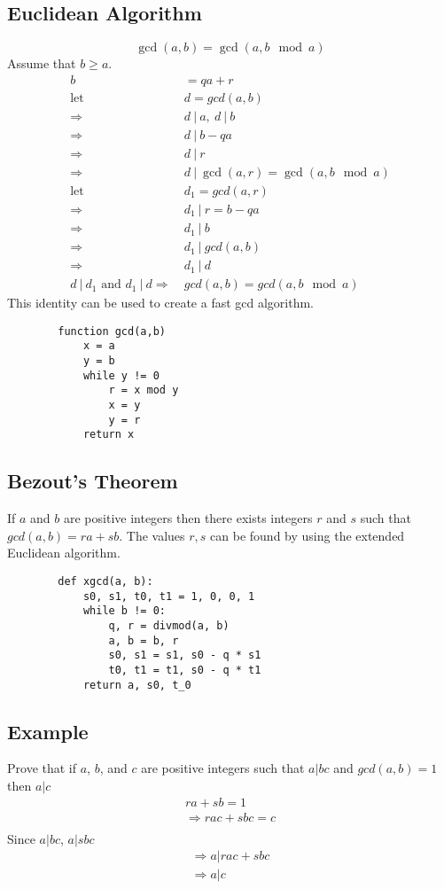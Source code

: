 \documentclass{article}
\theoremstyle{mytheoremstyle}
\theoremstyle{mytheoremstyle}
\theoremstyle{myproblemstyle}
\begin{document}
    \subsection*{Euclidean Algorithm}
    \[
        \gcd(a,b) = \gcd(a, b\mod a)
    \]
    Assume that $b \ge a$.
    \begin{align*}
        b &= qa+r \\
        \text{let}\ &d = gcd(a,b) \\
        \Rightarrow\ & d\ |\ a,\ d\ |\ b \\
        \Rightarrow\ & d\ |\ b-qa \\
        \Rightarrow\ & d\ |\ r \\
        \Rightarrow\ & d\ |\ \gcd(a,r) = \gcd(a,b \mod a) \\
        \text{let}\ &d_1 = gcd(a,r) \\
        \Rightarrow\ & d_1\ |\ r = b-qa \\
        \Rightarrow\ & d_1\ |\ b \\
        \Rightarrow\ & d_1\ |\ gcd(a,b) \\
        \Rightarrow\ & d_1\ |\ d \\
        d\ |\ d_1 \text{ and } d_1\ |\ d \Rightarrow\ & gcd(a,b) = gcd(a, b\mod a)
    \end{align*}
    This identity can be used to create a fast gcd algorithm.
    \begin{verbatim}
        function gcd(a,b)
            x = a
            y = b
            while y != 0
                r = x mod y
                x = y
                y = r
            return x
    \end{verbatim}

    \subsection*{Bezout's Theorem}
    If $a$ and $b$ are positive integers then there exists integers $r$ and $s$
    such that $gcd(a,b) = ra+sb$. The values $r,s$ can be found by using the
    extended Euclidean algorithm.
    \begin{verbatim}
        def xgcd(a, b):
            s0, s1, t0, t1 = 1, 0, 0, 1
            while b != 0:
                q, r = divmod(a, b)
                a, b = b, r
                s0, s1 = s1, s0 - q * s1
                t0, t1 = t1, s0 - q * t1
            return a, s0, t_0
    \end{verbatim}

    \subsection*{Example}
    Prove that if $a$, $b$, and $c$ are positive integers such that $a|bc$ and $gcd(a,b)=1$
    then $a|c$
    \begin{align*}
        ra+sb = 1 \\
        \Rightarrow rac + sbc = c \\
    \end{align*}
    Since $a|bc$, $a|sbc$
    \begin{align*}
        \Rightarrow a | rac + sbc \\
        \Rightarrow a | c
    \end{align*}
\end{document}
